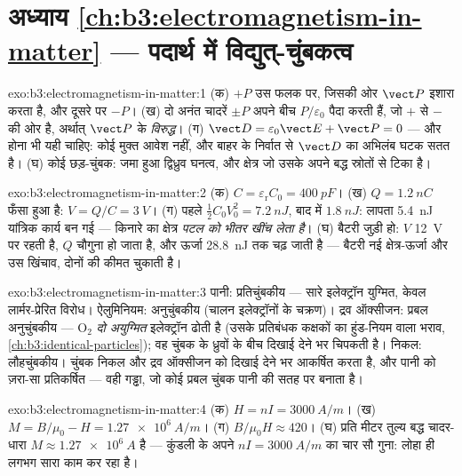 \section*{अध्याय \ref{ch:b3:electromagnetism-in-matter} --- पदार्थ में विद्युत्-चुंबकत्व}

\begin{solution}{exo:b3:electromagnetism-in-matter:1}
(क) $+P$ उस फलक पर, जिसकी ओर $\vect P$ इशारा करता है, और दूसरे पर
$-P$। (ख) दो अनंत चादरें $\pm P$ अपने बीच $P/\varepsilon_0$ पैदा करती
हैं, जो $+$ से $-$ की ओर है, अर्थात् $\vect P$ के \emph{विरुद्ध}। (ग)
$\vect D = \varepsilon_0\vect E + \vect P = 0$ --- और होना भी यही
चाहिए: कोई मुक्त आवेश नहीं, और बाहर के निर्वात से $\vect D$ का
अभिलंब घटक सतत है। (घ) कोई छड़-चुंबक: जमा हुआ द्विध्रुव घनत्व, और
क्षेत्र जो उसके अपने बद्ध स्रोतों से टिका है।
\end{solution}

\begin{solution}{exo:b3:electromagnetism-in-matter:2}
(क) $C = \varepsilon_{\text{r}}C_0 = \qty{400}{pF}$। (ख) $Q =
\qty{1.2}{nC}$ फँसा हुआ है: $V = Q/C = \qty{3}{V}$। (ग)
पहले $\tfrac12C_0V_0^2 = \qty{7.2}{nJ}$, बाद में $\qty{1.8}{nJ}$:
लापता \qty{5.4}{nJ} यांत्रिक कार्य बन गई --- किनारे का
क्षेत्र \emph{पटल को भीतर खींच लेता है}। (घ) बैटरी जुड़ी हो: $V$
\qty{12}{V} पर रहती है, $Q$ चौगुना हो जाता है, और ऊर्जा \qty{28.8}{nJ}
तक चढ़ जाती है --- बैटरी नई क्षेत्र-ऊर्जा और उस खिंचाव, दोनों की कीमत
चुकाती है।
\end{solution}

\begin{solution}{exo:b3:electromagnetism-in-matter:3}
पानी: प्रतिचुंबकीय --- सारे इलेक्ट्रॉन युग्मित, केवल लार्मर-प्रेरित
विरोध। ऐलुमिनियम: अनुचुंबकीय (चालन इलेक्ट्रॉनों के चक्रण)।
द्रव ऑक्सीजन: प्रबल अनुचुंबकीय --- O$_2$ \emph{दो अयुग्मित}
इलेक्ट्रॉन ढोती है (उसके प्रतिबंधक कक्षकों का हुंड-नियम वाला भराव,
\cref{ch:b3:identical-particles}); वह चुंबक के ध्रुवों के बीच दिखाई
देने भर चिपकती है। निकल: लौहचुंबकीय। चुंबक निकल और द्रव ऑक्सीजन को
दिखाई देने भर आकर्षित करता है, और पानी को ज़रा-सा प्रतिकर्षित
--- वही गड्ढा, जो कोई प्रबल चुंबक पानी की सतह पर बनाता है।
\end{solution}

\begin{solution}{exo:b3:electromagnetism-in-matter:4}
(क) $H = nI = \qty{3000}{A/m}$। (ख) $M = B/\mu_0 - H =
\qty{1.27e6}{A/m}$। (ग) $B/\mu_0H \approx 420$। (घ) प्रति मीटर
तुल्य बद्ध चादर-धारा $M \approx \qty{1.27e6}{A}$ है
--- कुंडली के अपने $nI = \qty{3000}{A/m}$ का चार सौ गुना:
लोहा ही लगभग सारा काम कर रहा है।
\end{solution}

